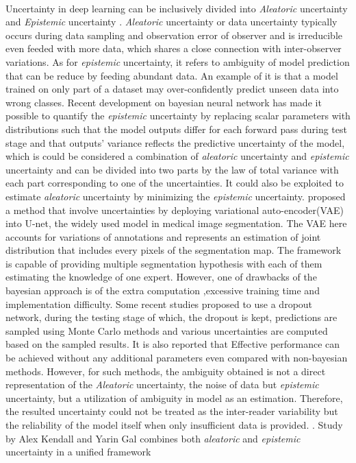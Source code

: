 \documentclass[12pt]{extarticle}
\begin{document}
\paragraph{}
Uncertainty in deep learning can be inclusively divided into \textit{Aleatoric}
uncertainty and \textit{Epistemic} uncertainty \cite{kendall2017uncertainties}.
\textit{Aleatoric} uncertainty or data uncertainty typically occurs during data sampling and
observation error of observer and is irreducible even feeded with more data, which shares a
close connection with inter-observer variations. As for \textit{epistemic}
uncertainty, it refers to ambiguity of model prediction that can be reduce by feeding abundant data.
An example of it is that a model trained on only part of a dataset may over-confidently
predict unseen data into wrong classes. Recent development on 
bayesian neural network has made it possible to quantify the 
\textit{epistemic} uncertainty by replacing scalar parameters with distributions such that 
the model outputs differ for each forward pass during test stage and 
that outputs' variance reflects the predictive uncertainty of the model, which is could be 
considered a combination of \textit{aleatoric} uncertainty and \textit{epistemic} uncertainty 
and can be divided into two parts by the law of total variance with each part corresponding to 
one of the uncertainties. It could also be exploited to estimate \textit{aleatoric} uncertainty by 
minimizing the \textit{epistemic} uncertainty. \cite{kohl2019probabilistic} 
proposed a method that involve uncertainties by deploying variational 
auto-encoder(VAE) into U-net, the widely used model in medical image segmentation. 
The VAE here accounts for variations of annotations and represents an 
estimation of joint distribution that includes every pixels of the segmentation map. 
The framework is capable of providing multiple segmentation 
hypothesis with each of them estimating the knowledge of one expert.
However, one of drawbacks of the bayesian approach is of the extra computation
,excessive training time and implementation difficulty. 
Some recent studies proposed to use a dropout network, during the testing stage of which, 
the dropout is kept, predictions are sampled using Monte Carlo methods 
and various uncertainties are computed based on the sampled results.
It is also reported that Effective performance can be achieved 
without any additional parameters even compared with non-bayesian methods. 
However, for such methods, the ambiguity obtained is
not a direct representation of the \textit{Aleatoric} uncertainty,
the noise of data but \textit{epistemic} uncertainty, but a utilization of ambiguity in model
\cite{kendall2017uncertainties} as an estimation. Therefore, the resulted uncertainty could not
be treated as the inter-reader variability but the reliability of 
the model itself when only insufficient data is provided. 
\cite{nair2018exploring}. Study by Alex Kendall and Yarin Gal \cite{kendall2017uncertainties} 
combines both \textit{aleatoric} and \textit{epistemic} uncertainty in a unified framework 
\end{document}
